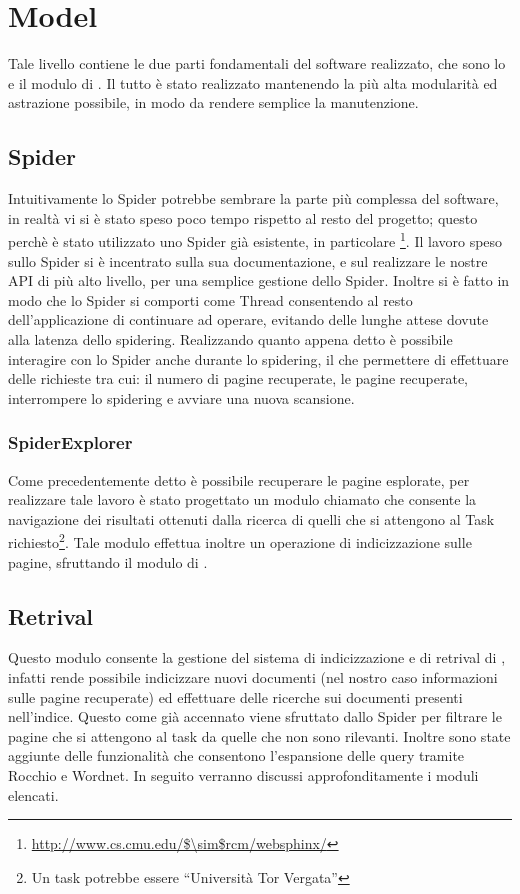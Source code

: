 \section{Model}
Tale livello contiene le due parti fondamentali del software realizzato, che sono lo  e il modulo di . Il tutto è stato realizzato mantenendo la più alta modularità ed astrazione possibile, in modo da rendere semplice la manutenzione.
\subsection{Spider}
Intuitivamente lo Spider potrebbe sembrare la parte più complessa del software, in realtà vi si è stato speso poco tempo rispetto al resto del progetto; questo perchè è stato utilizzato uno Spider già esistente, in particolare \footnote{\url{http://www.cs.cmu.edu/$\sim$rcm/websphinx/}}. Il lavoro speso sullo Spider si è incentrato sulla sua documentazione, e sul realizzare le nostre API di più alto livello, per una semplice gestione dello Spider. Inoltre si è fatto in modo che lo Spider si comporti come Thread consentendo al resto dell'applicazione di continuare ad operare, evitando delle lunghe attese dovute alla latenza dello spidering. Realizzando quanto appena detto è possibile interagire con lo Spider anche durante lo spidering, il che permettere di effettuare delle richieste tra cui: il numero di pagine recuperate, le pagine recuperate, interrompere lo spidering e avviare una nuova scansione.
\subsubsection{SpiderExplorer}
Come precedentemente detto è possibile recuperare le pagine esplorate, per realizzare tale lavoro è stato progettato un modulo chiamato  che consente la navigazione dei risultati ottenuti dalla ricerca di quelli che si attengono al Task richiesto\footnote{Un task potrebbe essere ``Università Tor Vergata''}. Tale modulo effettua inoltre un operazione di indicizzazione sulle pagine, sfruttando il modulo di .
\subsection{Retrival}
Questo modulo consente la gestione del sistema di indicizzazione e di retrival di , infatti rende possibile indicizzare nuovi documenti (nel nostro caso informazioni sulle pagine recuperate) ed effettuare delle ricerche sui documenti presenti nell'indice. Questo come già accennato viene sfruttato dallo Spider per filtrare le pagine che si attengono al task da quelle che non sono rilevanti. Inoltre sono state aggiunte delle funzionalità che consentono l'espansione delle query tramite Rocchio e Wordnet. In seguito verranno discussi approfonditamente i moduli elencati.
